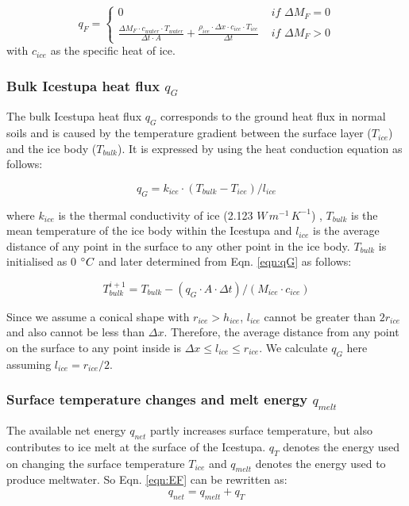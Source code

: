 \documentclass[utf8]{frontiersSCNS} %
\begin{document}
\begin{equation} 
  q_{F} = \left\{ \begin{array}{ll}
         0 & \textit{ if } \Delta M_{F} = 0\\ \frac{ \Delta M_F \cdot c_{water} \cdot T_{water}}{\Delta t \cdot A} +
         \frac{\rho_{ice} \cdot \Delta x \cdot c_{ice} \cdot T_{ice}}{\Delta t} & \textit{ if } \Delta M_{F} > 0 
    \end{array} \right.  \label{eqn:qF}
\end{equation} 
with $c_{ice}$ as the specific heat of ice. 

\subsubsection{Bulk Icestupa heat flux \texorpdfstring{$q_{G}$}{Lg}} \label{sec:Bulkflux}
The bulk Icestupa heat flux $q_{G}$ corresponds to the ground heat flux in normal soils and is caused by the
temperature gradient between the surface layer ($T_{ice}$) and the ice body ($T_{bulk}$). It is expressed by using the
heat conduction equation as follows:

\begin{equation} q_{G} = k_{ice} \cdot (T_{bulk}-T_{ice})/l_{ice} \label{eqn:qG}    \end{equation}

where $k_{ice}$ is the thermal conductivity of ice (2.123 $W\, m^{-1}\,K^{-1}$) , $T_{bulk}$ is the mean temperature of
the ice body within the Icestupa and $l_{ice}$ is the average distance of any point in the surface to any other point
in the ice body. $T_{bulk}$ is initialised as 0 $\degree C$ and later determined from Eqn. \ref{eqn:qG} as follows:

\begin{equation} T_{bulk}^{i+1} = T_{bulk} - (q_{G} \cdot A \cdot \Delta t)/(M_{ice} \cdot c_{ice}) \end{equation}

Since we assume a conical shape with $r_{ice} > h_{ice}$, $l_{ice}$ cannot be greater than $2r_{ice}$ and also cannot
be less than $\Delta x$. Therefore, the average distance from any point on the surface to any point inside is $\Delta
x \leq l_{ice} \leq r_{ice}$. We calculate $q_{G}$ here assuming $l_{ice} = r_{ice}/2$.

\subsubsection{Surface temperature changes and melt energy \texorpdfstring{$q_{melt}$}{Lg}}
The available net energy $q_{net}$ partly increases surface temperature, but also contributes to ice melt at the
surface of the Icestupa. $q_{T}$ denotes the energy used on changing the surface temperature $T_{ice}$ and $q_{melt}$
denotes the energy used to produce meltwater. So Eqn. \ref{eqn:EF} can be rewritten as: \begin{equation} q_{net} =
q_{melt} + q_{T} \end{equation}
\end{document}
